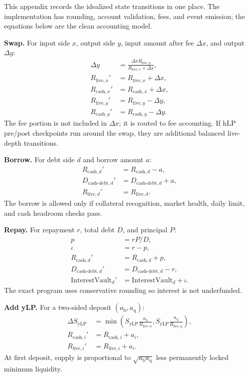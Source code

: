 \documentclass[11pt]{article}
\newcommand{\base}{\mathrm{b}}
\newcommand{\qasset}{\mathrm{q}}
\newcommand{\cash}{\mathrm{cash}}
\newcommand{\live}{\mathrm{live}}
\newcommand{\ylp}{\mathrm{yLP}}
\newcommand{\debt}{\mathrm{debt}}
\begin{document}
This appendix records the idealized state transitions in one place. The implementation has rounding, account validation, fees, and event emission; the equations below are the clean accounting model.

\textbf{Swap.} For input side $x$, output side $y$, input amount after fee $\Delta x$, and output $\Delta y$:
\begin{align}
\Delta y &= \frac{\Delta x R_{\live,y}}{R_{\live,x}+\Delta x},\\
R_{\live,x}' &= R_{\live,x}+\Delta x,\\
R_{\cash,x}' &= R_{\cash,x}+\Delta x,\\
R_{\live,y}' &= R_{\live,y}-\Delta y,\\
R_{\cash,y}' &= R_{\cash,y}-\Delta y.
\end{align}
The fee portion is not included in $\Delta x$; it is routed to fee accounting. If hLP pre/post checkpoints run around the swap, they are additional balanced live-depth transitions.

\textbf{Borrow.} For debt side $d$ and borrow amount $a$:
\begin{align}
R_{\cash,d}' &= R_{\cash,d}-a,\\
D_{\cash\text{-}\debt,d}' &= D_{\cash\text{-}\debt,d}+a,\\
R_{\live,d}' &= R_{\live,d}.
\end{align}
The borrow is allowed only if collateral recognition, market health, daily limit, and cash headroom checks pass.

\textbf{Repay.} For repayment $r$, total debt $D$, and principal $P$:
\begin{align}
p &= rP/D,\\
\iota &= r-p,\\
R_{\cash,d}' &= R_{\cash,d}+p,\\
D_{\cash\text{-}\debt,d}' &= D_{\cash\text{-}\debt,d}-r,\\
\mathrm{InterestVault}_d' &= \mathrm{InterestVault}_d+\iota.
\end{align}
The exact program uses conservative rounding so interest is not underfunded.

\textbf{Add yLP.} For a two-sided deposit $(a_\base,a_\qasset)$:
\begin{align}
\Delta S_{\ylp} &=
\min\left(
S_{\ylp}\frac{a_\base}{R_{\live,\base}},
S_{\ylp}\frac{a_\qasset}{R_{\live,\qasset}}
\right),\\
R_{\cash,i}' &= R_{\cash,i}+a_i,\\
R_{\live,i}' &= R_{\live,i}+a_i.
\end{align}
At first deposit, supply is proportional to $\sqrt{a_\base a_\qasset}$ less permanently locked minimum liquidity.
\end{document}
